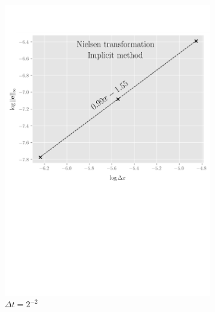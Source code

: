 \begin{figure}[tbp]
\begin{subfigure}{0.4\textwidth}
    \includegraphics[width=\textwidth]{chapters/chapter3/ConvergenceSpaceImplicitNielsen.pdf}
    \caption{$\Delta{x}=2^{-6},\dots,2^{-8}$}
    \caption*{$\Delta{t}=2^{-2}$}
    \label{fig:finitedifferencesschemes:numericaresults:nielsen_implicit_space}
  \end{subfigure}
  \hspace{0.5cm}
  \begin{subfigure}{0.4\textwidth}
    \label{fig:finitedifferencesschemes:numericaresults:nielsen_implicit_time}
    \centering

\end{subfigure}
\end{figure}

